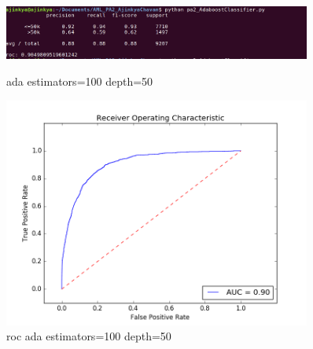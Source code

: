\documentclass{article}
\begin{document}
\begin{figure}
    \centering
    \begin{minipage}{0.45\textwidth}
        \centering
        \includegraphics[width=0.9\textwidth]{ada_100_50.png} %
        \caption{ada estimators=100 depth=50}
    \end{minipage}\hfill
    \begin{minipage}{0.45\textwidth}
        \centering
        \includegraphics[width=0.9\textwidth]{roc_ada_100_50.png} %
        \caption{roc ada estimators=100 depth=50}
    \end{minipage}
\end{figure}
\end{document}
